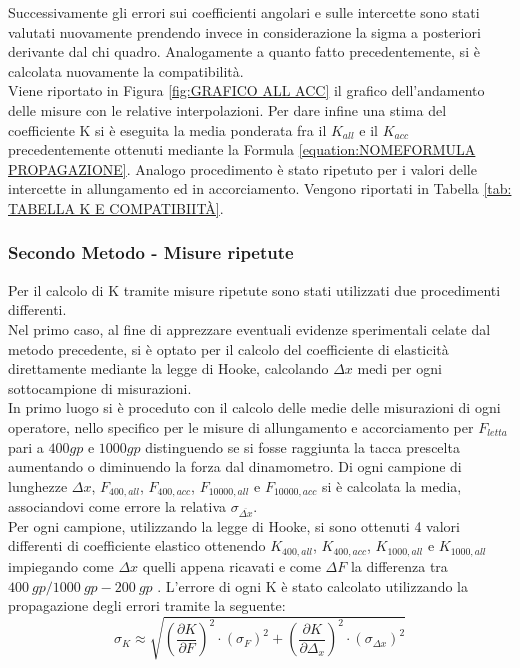 \documentclass[a4paper,11pt,oneside]{article}
\begin{document}
Successivamente gli errori sui coefficienti angolari e sulle intercette sono stati valutati nuovamente prendendo invece in considerazione la sigma a posteriori derivante dal chi quadro. Analogamente a quanto fatto precedentemente, si è calcolata nuovamente la compatibilità.\\
Viene riportato in Figura \ref{fig:GRAFICO ALL ACC} il grafico dell'andamento delle misure con le relative interpolazioni.
Per dare infine una stima del coefficiente K si è eseguita la media ponderata fra il $K_{all}$ e il $K_{acc}$ precedentemente ottenuti mediante la Formula \ref{equation:NOMEFORMULA PROPAGAZIONE}. Analogo procedimento è stato ripetuto per i valori delle intercette in allungamento ed in accorciamento. Vengono riportati in Tabella \ref{tab: TABELLA K E COMPATIBIITÀ}.

\subsubsection*{Secondo Metodo - Misure ripetute}
Per il calcolo di K tramite misure ripetute sono stati utilizzati due procedimenti differenti.\\
Nel primo caso, al fine di apprezzare eventuali evidenze sperimentali celate dal metodo precedente, si è optato per il calcolo del coefficiente di elasticità direttamente mediante la legge di Hooke, calcolando $\Delta x$ medi per ogni sottocampione di misurazioni.\\ 

In primo luogo si è proceduto con il calcolo delle medie delle misurazioni di ogni operatore, nello specifico per le misure di allungamento e accorciamento per $F_{letta}$ pari a $\SI{400}gp$ e $\SI{1000}gp$ distinguendo se si fosse raggiunta la tacca prescelta aumentando o diminuendo la forza dal dinamometro. Di ogni campione di lunghezze $\Delta x$, $F_{400, all}$, $F_{400, acc}$, $F_{10000, all}$ e $F_{10000, acc}$ si è calcolata la media, associandovi come errore la relativa $\sigma_{\overline{\Delta x}}$.\\
Per ogni campione, utilizzando la legge di Hooke, si sono ottenuti 4 valori differenti di coefficiente elastico ottenendo $K_{400, all}$, $K_{400, acc}$, $K_{1000, all}$ e $K_{1000, all}$ impiegando come $\Delta x$ quelli appena ricavati e come $\Delta F$ la differenza tra $\SI{400}{gp} / \SI{1000}{gp} - \SI{200}{gp}$ . L'errore di ogni K è stato calcolato utilizzando la propagazione degli errori tramite la seguente:
\begin{equation*}
\sigma_K \approx \sqrt{\left ( \frac{\partial K }{\partial F} \right )^2 \cdot \left ( \sigma_F \right )^2 + \left ( \frac{\partial K }{\partial \Delta_x} \right )^2 \cdot \left ( \sigma_{\Delta x} \right )^2 }
\end{equation*}
\end{document}
